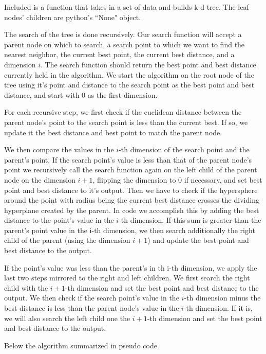 Included is a function that takes in a set of data and builds k-d tree.
The leaf nodes' children are  python's ``None" object.

The search of the tree is done recursively.
Our search function will accept a parent node on which to search, a search point to which we want to find the nearest neighbor, the current best point, the current best distance, and a dimension $i$.
The search function should return the best point and best distance currently held in the algorithm.
We start the algorithm on the root node of the tree using it's point and distance to the search point as the best point and best distance, and start with $0$ as the first dimension.


For each recursive step, we first check if the euclidean distance between the parent node's point to the search point is less than the current best.
If so, we update it the best distance and best point to match the parent node.


We then compare the values in the $i$-th dimension of the search point and the parent's point.
If the search point's value is less than that of the parent node's point we recursively call the search function again on the left child of the parent node on the dimension $i+1$, flipping the dimension to $0$ if necessary, and set best point and best distance to it's output.
Then we have to check if the hypersphere around the point with radius being the current best distance crosses the dividing hyperplane created by the parent.
In code we accomplish this by adding the best distance to the point's value in the $i$-th dimension.
If this sum is greater than the parent's point value in the i-th dimension, we then search additionally the right child of the parent (using the dimension $i+1$) and update the best point and best distance to the output.


If the point's value was less than the parent's in th i-th dimension, we apply the last two steps mirrored to the right and left children.
We first search the right child with the $i+1$-th dimension and set the best point and best distance to the output.
We then check if the search point's value in the $i$-th dimension minus the best distance is less than the parent node's value in the $i$-th dimension. 
If it is, we will also search the left child one the $i+1$-th dimension and set the best point and best distance to the output.

Below the algorithm summarized in pseudo code 

